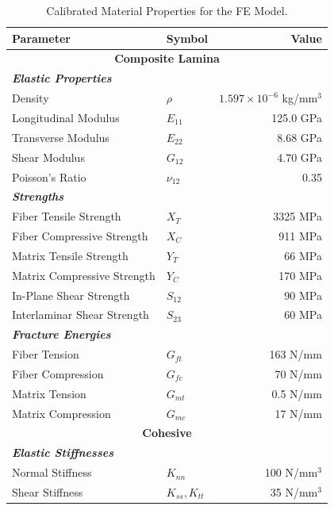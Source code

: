 \documentclass[
  preprint,
  12pt,
  a4paper
]{elsarticle}
\begin{document}
\begin{table}[htbp]
    \centering
    \caption{Calibrated Material Properties for the FE Model.}
    \label{tab:material_properties}
    \renewcommand{\arraystretch}{1.2}
    \begin{tabular}{l l r}
        \toprule
        \textbf{Parameter} & \textbf{Symbol} & \textbf{Value} \\
        \midrule
        \multicolumn{3}{c}{\textbf{Composite Lamina}} \\
        \textit{\textbf{Elastic Properties}} & & \\
        Density & $\rho$ & $1.597 \times 10^{-6}$ kg/mm$^3$ \\
        Longitudinal Modulus & $E_{11}$ & 125.0 GPa \\
        Transverse Modulus & $E_{22}$ & 8.68 GPa \\
        Shear Modulus & $G_{12}$ & 4.70 GPa \\
        Poisson's Ratio & $\nu_{12}$ & 0.35 \\
        
        \textit{\textbf{Strengths}} & & \\
        Fiber Tensile Strength & $X_T$ & 3325 MPa \\
        Fiber Compressive Strength & $X_C$ & 911 MPa \\
        Matrix Tensile Strength & $Y_T$ & 66 MPa \\
        Matrix Compressive Strength & $Y_C$ & 170 MPa \\
        In-Plane Shear Strength & $S_{12}$ & 90 MPa \\
        Interlaminar Shear Strength & $S_{23}$ & 60 MPa \\
        
        \textit{\textbf{Fracture Energies}} & & \\
        Fiber Tension & $G_{ft}$ & 163 N/mm \\
        Fiber Compression & $G_{fc}$ & 70 N/mm \\
        Matrix Tension & $G_{mt}$ & 0.5 N/mm \\
        Matrix Compression & $G_{mc}$ & 17 N/mm \\
        
        \midrule
        \multicolumn{3}{c}{\textbf{Cohesive}} \\
        \textit{\textbf{Elastic Stiffnesses}} & & \\
        Normal Stiffness & $K_{nn}$ & 100 N/mm$^3$ \\
        Shear Stiffness & $K_{ss}, K_{tt}$ & 35 N/mm$^3$ \\
        

\end{tabular}
\end{table}
\end{document}
